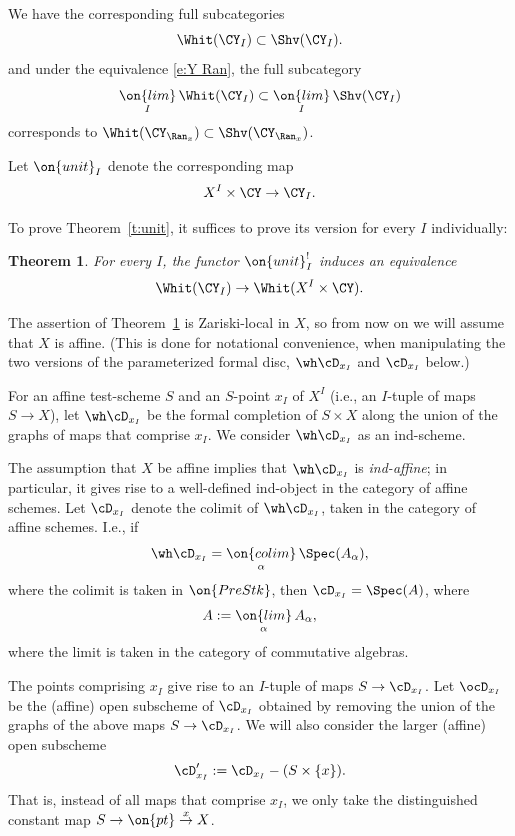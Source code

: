 \documentclass[9pt]{amsart}
\newtheorem{thm}[subsubsection]{Theorem}
\theoremstyle{definition}
\theoremstyle{remark}
\newcommand{\thmref}[1]{Theorem~\ref{#1}}
\numberwithin{equation}{section}
\begin{document}
We have the corresponding full subcategories
$$\Whit(\CY_I)\subset \Shv(\CY_I).$$
and under the equivalence \eqref{e:Y Ran}, the full subcategory 
$$\underset{I}{\on{lim}}\, \Whit(\CY_I)\subset \underset{I}{\on{lim}}\, \Shv(\CY_I)$$
corresponds to $\Whit(\CY_{\Ran_x} )\subset \Shv(\CY_{\Ran_x} )$.

\medskip

Let $\on{unit}_I$ denote the corresponding map
$$X^I\times  \CY\to \CY_I.$$

To prove \thmref{t:unit}, it suffices to prove its version for every $I$ individually:

\begin{thm} \label{t:unit I}
For every $I$, the functor $\on{unit}_I^!$ induces an equivalence
$$\Whit(\CY_I)\to \Whit(X^I\times \CY).$$
\end{thm} 

The assertion of \thmref{t:unit I} is Zariski-local in $X$, so from now on we will assume that $X$ is affine.
(This is done for notational convenience, when manipulating the two versions of the parameterized formal disc, 
$\wh\cD_{x_I}$ and $\cD_{x_I}$ below.)

\sssec{} 

For an affine test-scheme $S$ and an $S$-point $x_I$ of $X^I$ (i.e., an $I$-tuple of maps $S\to X$),
let $\wh\cD_{x_I}$ be the formal completion of $S\times X$ along the union of the graphs of maps that comprise $x_I$.
We consider $\wh\cD_{x_I}$ as an ind-scheme. 

\medskip

The assumption that $X$ be affine implies that $\wh\cD_{x_I}$ is 
\emph{ind-affine}; in particular, it gives rise to a well-defined ind-object in the category of affine schemes. Let
$\cD_{x_I}$ denote the colimit of $\wh\cD_{x_I}$, taken in the category of affine schemes. I.e., if
$$\wh\cD_{x_I}=\underset{\alpha}{\on{colim}}\, \Spec(A_\alpha),$$
where the colimit is taken in $\on{PreStk}$, then $\cD_{x_I}=\Spec(A)$, where
$$A:=\underset{\alpha}{\on{lim}}\, A_\alpha,$$
where the limit is taken in the category of commutative algebras.

\medskip

The points comprising $x_I$ give rise to an $I$-tuple of maps $S\to \cD_{x_I}$. 
Let $\ocD_{x_I}$ be the (affine) open subscheme of $\cD_{x_I}$ obtained by removing the union of the graphs of the above maps
$S\to \cD_{x_I}$. We will also consider the larger (affine) open subscheme 
$$\cD'_{x_I}:=\cD_{x_I}-(S\times \{x\}).$$
That is, instead of all maps that comprise $x_I$, we only take the distinguished constant map $S\to \on{pt}\overset{x}\to X$. 
\end{document}
